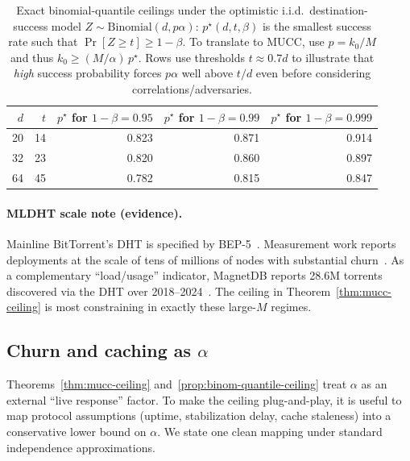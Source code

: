 \documentclass[11pt]{article}
\begin{document}
\begin{table}[h]
\centering
\begin{tabular}{@{}rrrrr@{}}
\toprule
$d$ & $t$ & $p^\star$ for $1-\beta=0.95$ & $p^\star$ for $1-\beta=0.99$ & $p^\star$ for $1-\beta=0.999$ \\
\midrule
20 & 14 & 0.823 & 0.871 & 0.914 \\
32 & 23 & 0.820 & 0.860 & 0.897 \\
64 & 45 & 0.782 & 0.815 & 0.847 \\
\bottomrule
\end{tabular}
\caption{Exact binomial-quantile ceilings under the optimistic i.i.d.\ destination-success model $Z\sim\mathrm{Binomial}(d,p\alpha)$: 
$p^\star(d,t,\beta)$ is the smallest success rate such that $\Pr[Z\ge t]\ge 1-\beta$. 
To translate to MUCC, use $p = k_0/M$ and thus $k_0 \ge (M/\alpha)\,p^\star$. 
Rows use thresholds $t\approx 0.7d$ to illustrate that \emph{high} success probability forces $p\alpha$ well above $t/d$ even before considering correlations/adversaries.}
\label{tab:binom-quantile}
\end{table}


\paragraph{MLDHT scale note (evidence).}
Mainline BitTorrent's DHT is specified by BEP-5~\cite{bep5}.
Measurement work reports deployments at the scale of tens of millions of nodes with substantial churn~\cite{wang2013mldht,mldhtProjectPage}.
As a complementary ``load/usage'' indicator, MagnetDB reports 28.6M torrents discovered via the DHT over 2018--2024~\cite{magnetdb2025}.
The ceiling in Theorem~\ref{thm:mucc-ceiling} is most constraining in exactly these large-$M$ regimes.



\subsection{Churn and caching as \texorpdfstring{$\alpha$}{alpha}}
\label{sec:churn_caching}
Theorems~\ref{thm:mucc-ceiling} and~\ref{prop:binom-quantile-ceiling} treat $\alpha$ as an external ``live response'' factor.
To make the ceiling plug-and-play, it is useful to map protocol assumptions (uptime, stabilization delay, cache staleness) into a conservative lower bound on $\alpha$.
We state one clean mapping under standard independence approximations.
\end{document}

